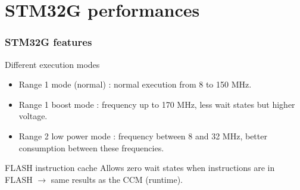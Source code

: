 \documentclass[
	11pt, %
]{beamer}
\begin{document}
\section{STM32G performances}
\begin{frame}
	\frametitle{STM32G features}
	\begin{block}{Different execution modes}
		\begin{itemize}
			\item Range 1 mode (normal) : normal execution from 8 to 150 MHz.
			\item Range 1 boost mode : frequency up to 170 MHz, less wait states but higher voltage.
			\item Range 2 low power mode : frequency between 8 and 32 MHz, better consumption between these frequencies.
		\end{itemize}
	\end{block}
	\begin{block}{FLASH instruction cache}
		Allows zero wait states when instructions are in FLASH $\rightarrow$ same results as the CCM (runtime).
	\end{block}
\end{frame}
\end{document}
